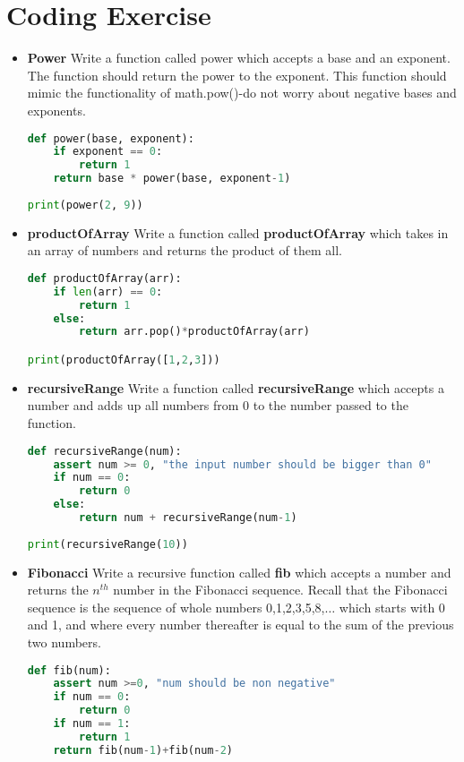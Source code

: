 \documentclass[10pt,letterpaper]{article}
\begin{document}
\section{Coding Exercise}
\begin{itemize}
\item \textbf{Power} Write a function called power which accepts a base and an exponent. The function should return the power to the exponent. This function should mimic the functionality of math.pow()-do not worry about negative bases and exponents. 
\begin{lstlisting}[language=Python, caption=Solution for productOfArray]
def power(base, exponent):
    if exponent == 0:
        return 1
    return base * power(base, exponent-1)
    
print(power(2, 9))
\end{lstlisting}
\item \textbf{productOfArray} Write a function called \textbf{productOfArray} which takes in an array of numbers and returns the product of them all.
\begin{lstlisting}[language=Python, caption=Solution for productOfArray]
def productOfArray(arr):
    if len(arr) == 0:
        return 1
    else:
        return arr.pop()*productOfArray(arr)

print(productOfArray([1,2,3]))
\end{lstlisting}

\item \textbf{recursiveRange} Write a function called \textbf{recursiveRange} which accepts a number and adds up all numbers from 0 to the number passed to the function.
\begin{lstlisting}[language=Python, caption=Solution for recursiveRange]
def recursiveRange(num):
    assert num >= 0, "the input number should be bigger than 0"
    if num == 0:
        return 0
    else:
        return num + recursiveRange(num-1)
    
print(recursiveRange(10))
\end{lstlisting}

\item \textbf{Fibonacci} Write a recursive function called \textbf{fib} which accepts a number and returns the $n^{th}$ number in the Fibonacci sequence. Recall that the Fibonacci sequence is the sequence of whole numbers 0,1,2,3,5,8,$\ldots$ which starts with 0 and 1, and where every number thereafter is equal to the sum of the previous two numbers.
\begin{lstlisting}[language=Python, caption=Solution for fib]
def fib(num):
    assert num >=0, "num should be non negative"
    if num == 0:
        return 0
    if num == 1:
        return 1
    return fib(num-1)+fib(num-2)
    

\end{lstlisting}
\end{itemize}
\end{document}
